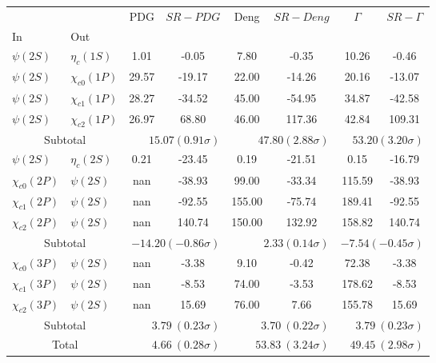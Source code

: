 \begin{tabular}{|l|l|c|c|c|c|c|c|}%
\hline%
&&PDG&$SR-PDG$&Deng&$SR-Deng$&$\Gamma$&$SR-\Gamma$\\%
In&Out&&&&&&\\%
\hline%
$\psi(2S)$&$\eta_{c}(1S)$&1.01&-0.05&7.80&-0.35&10.26&-0.46\\%
$\psi(2S)$&$\chi_{c0}(1P)$&29.57&-19.17&22.00&-14.26&20.16&-13.07\\%
$\psi(2S)$&$\chi_{c1}(1P)$&28.27&-34.52&45.00&-54.95&34.87&-42.58\\%
$\psi(2S)$&$\chi_{c2}(1P)$&26.97&68.80&46.00&117.36&42.84&109.31\\%
\hline%
\hline%
\multicolumn{2}{|c|}{Subtotal}&\multicolumn{2}{|r|}{$15.07 (0.91\sigma)$}&\multicolumn{2}{|r|}{$47.80 (2.88\sigma)$}&\multicolumn{2}{|r|}{$53.20 (3.20\sigma)$}\\%
\hline%
\hline%
$\psi(2S)$&$\eta_{c}(2S)$&0.21&-23.45&0.19&-21.51&0.15&-16.79\\%
$\chi_{c0}(2P)$&$\psi(2S)$&nan&-38.93&99.00&-33.34&115.59&-38.93\\%
$\chi_{c1}(2P)$&$\psi(2S)$&nan&-92.55&155.00&-75.74&189.41&-92.55\\%
$\chi_{c2}(2P)$&$\psi(2S)$&nan&140.74&150.00&132.92&158.82&140.74\\%
\hline%
\hline%
\multicolumn{2}{|c|}{Subtotal}&\multicolumn{2}{|r|}{$-14.20 (-0.86\sigma)$}&\multicolumn{2}{|r|}{$2.33 (0.14\sigma)$}&\multicolumn{2}{|r|}{$-7.54 (-0.45\sigma)$}\\%
\hline%
\hline%
$\chi_{c0}(3P)$&$\psi(2S)$&nan&-3.38&9.10&-0.42&72.38&-3.38\\%
$\chi_{c1}(3P)$&$\psi(2S)$&nan&-8.53&74.00&-3.53&178.62&-8.53\\%
$\chi_{c2}(3P)$&$\psi(2S)$&nan&15.69&76.00&7.66&155.78&15.69\\%
\hline%
\hline%
\multicolumn{2}{|c|}{Subtotal}&\multicolumn{2}{|r|}{$3.79~(0.23\sigma)$}&\multicolumn{2}{|r|}{$3.70~(0.22\sigma)$}&\multicolumn{2}{|r|}{$3.79~(0.23\sigma)$}\\%
\hline%
\hline%
\multicolumn{2}{|c|}{Total}&\multicolumn{2}{|r|}{$4.66~(0.28\sigma)$}&\multicolumn{2}{|r|}{$53.83~(3.24\sigma)$}&\multicolumn{2}{|r|}{$49.45~(2.98\sigma)$}\\%
\hline%
\end{tabular}